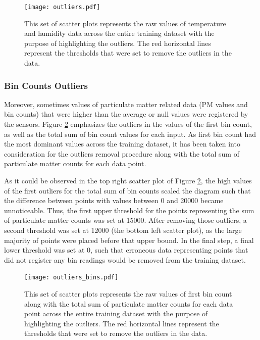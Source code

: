 \documentclass[bsc,frontabs,twoside,singlespacing,parskip,deptreport]{infthesis}     %
\begin{document}
\begin{figure}[h!]
  \center
  \texttt{[image: outliers.pdf]}
  \caption{This set of scatter plots represents the raw values of temperature and humidity data across the entire training dataset with the purpose of highlighting the outliers. The red horizontal lines represent the thresholds that were set to remove the outliers in the data.}
  \label{fig:outliers}
\end{figure}

\subsubsection*{Bin Counts Outliers}

Moreover, sometimes values of particulate matter related data (PM values and bin counts) that were higher than the average or null values were registered by the sensors. Figure \ref{fig:outliers-bins} emphasizes the outliers in the values of the first bin count, as well as the total sum of bin count values for each input. As first bin count had the most dominant values across the training dataset, it has been taken into consideration for the outliers removal procedure along with the total sum of particulate matter counts for each data point.

As it could be observed in the top right scatter plot of Figure \ref{fig:outliers-bins}, the high values of the first outliers for the total sum of bin counts scaled the diagram such that the difference between points with values between 0 and 20000 became unnoticeable. Thus, the first upper threshold for the points representing the sum of particulate matter counts was set at 15000. After removing those outliers, a second threshold was set at 12000 (the bottom left scatter plot), as the large majority of points were placed before that upper bound. In the final step, a final lower threshold was set at 0, such that erroneous data representing points that did not register any bin readings would be removed from the training dataset.

\begin{figure}[h!]
  \center
  \texttt{[image: outliers\_bins.pdf]}
  \caption{This set of scatter plots represents the raw values of first bin count along with the total sum of particulate matter counts for each data point across the entire training dataset with the purpose of highlighting the outliers. The red horizontal lines represent the thresholds that were set to remove the outliers in the data.}
  \label{fig:outliers-bins}
\end{figure}
\end{document}
